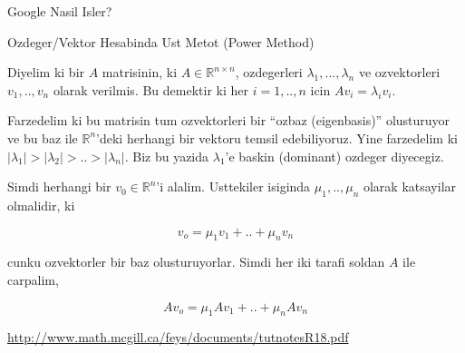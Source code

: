 \documentclass[12pt,fleqn]{article}\usepackage{../common}
\begin{document}
Google Nasil Isler? 

Ozdeger/Vektor Hesabinda Ust Metot (Power Method)

Diyelim ki bir $A$ matrisinin, ki $A \in \mathbb{R}^{n \times n}$,
ozdegerleri $\lambda_1,...,\lambda_n$ ve ozvektorleri $v_1,..,v_n$ olarak
verilmis. Bu demektir ki her $i=1,..,n$ icin $Av_i = \lambda_i v_i$.

Farzedelim ki bu matrisin tum ozvektorleri bir ``ozbaz (eigenbasis)''
olusturuyor ve bu baz ile $\mathbb{R}^n$'deki herhangi bir vektoru temsil
edebiliyoruz. Yine farzedelim ki $|\lambda_1| > |\lambda_2| > .. >
|\lambda_n| $. Biz bu yazida $\lambda_1$'e 
baskin (dominant) ozdeger diyecegiz.

Simdi herhangi bir $v_0 \in \mathbb{R}^n$'i alalim. Usttekiler isiginda
$\mu_1,..,\mu_n$ olarak katsayilar olmalidir, ki 

$$ v_o = \mu_1v_1 + .. + \mu_nv_n $$

cunku ozvektorler bir baz olusturuyorlar. Simdi her iki tarafi soldan $A$
ile carpalim, 

$$ A v_o = \mu_1 A v_1 + .. + \mu_n A v_n $$




\url{http://www.math.mcgill.ca/feys/documents/tutnotesR18.pdf}
\end{document}
